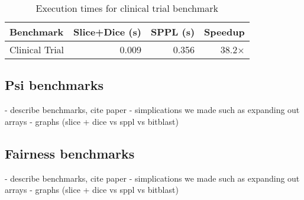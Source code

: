 \begin{table}[!t]
\centering
\begin{tabular}{lrrr}
\toprule
Benchmark & Slice+Dice (s) & SPPL (s) & Speedup \\
\midrule
Clinical Trial & 0.009 & 0.356 & 38.2× \\
\bottomrule
\end{tabular}
\caption{Execution times for clinical trial benchmark}
\end{table}


\subsection{Psi benchmarks}\label{sec:psi-benchmarks}
- describe benchmarks, cite paper
- simplications we made such as expanding out arrays
- graphs (slice + dice vs sppl vs bitblast)


\subsection{Fairness benchmarks}\label{sec:fairness-benchmarks}
- describe benchmarks, cite paper
- simplications we made such as expanding out arrays
- graphs (slice + dice vs sppl vs bitblast)

